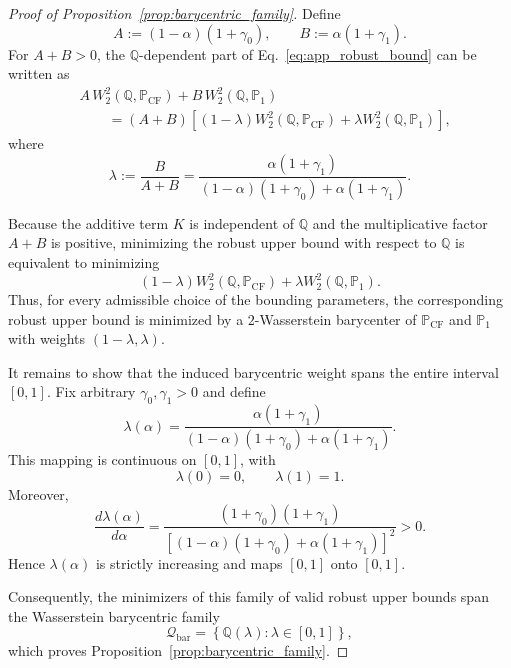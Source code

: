 \begin{proof}[Proof of Proposition~\ref{prop:barycentric_family}]
Define
\begin{equation}
A
:=
(1-\alpha)(1+\gamma_0),
\qquad
B
:=
\alpha(1+\gamma_1).
\label{eq:app_AB}
\end{equation}
For $A+B>0$, the $\mathbb{Q}$-dependent part of
Eq.~\ref{eq:app_robust_bound} can be written as
\begin{align}
&A\,W_2^2(\mathbb{Q},\mathbb{P}_{\mathrm{CF}})
+
B\,W_2^2(\mathbb{Q},\mathbb{P}_1)
\nonumber\\
&\qquad =
(A+B)
\left[
(1-\lambda)
W_2^2(\mathbb{Q},\mathbb{P}_{\mathrm{CF}})
+
\lambda
W_2^2(\mathbb{Q},\mathbb{P}_1)
\right],
\label{eq:app_normalization}
\end{align}
where
\begin{equation}
\lambda
:=
\frac{B}{A+B}
=
\frac{\alpha(1+\gamma_1)}
{(1-\alpha)(1+\gamma_0)+\alpha(1+\gamma_1)}.
\label{eq:app_lambda}
\end{equation}

Because the additive term $K$ is independent of $\mathbb{Q}$ and
the multiplicative factor $A+B$ is positive, minimizing the robust
upper bound with respect to $\mathbb{Q}$ is equivalent to minimizing
\begin{equation}
(1-\lambda)
W_2^2(\mathbb{Q},\mathbb{P}_{\mathrm{CF}})
+
\lambda
W_2^2(\mathbb{Q},\mathbb{P}_1).
\label{eq:app_barycentric_objective}
\end{equation}
Thus, for every admissible choice of the bounding parameters, the
corresponding robust upper bound is minimized by a $2$-Wasserstein
barycenter of $\mathbb{P}_{\mathrm{CF}}$ and $\mathbb{P}_1$ with
weights $(1-\lambda,\lambda)$.

It remains to show that the induced barycentric weight spans the
entire interval $[0,1]$. Fix arbitrary $\gamma_0,\gamma_1>0$ and
define
\begin{equation}
\lambda(\alpha)
=
\frac{\alpha(1+\gamma_1)}
{(1-\alpha)(1+\gamma_0)+\alpha(1+\gamma_1)}.
\end{equation}
This mapping is continuous on $[0,1]$, with
\begin{equation}
\lambda(0)=0,
\qquad
\lambda(1)=1.
\end{equation}
Moreover,
\begin{equation}
\frac{d\lambda(\alpha)}{d\alpha}
=
\frac{(1+\gamma_0)(1+\gamma_1)}
{
\left[
(1-\alpha)(1+\gamma_0)
+
\alpha(1+\gamma_1)
\right]^2
}
>0.
\label{eq:app_lambda_derivative}
\end{equation}
Hence $\lambda(\alpha)$ is strictly increasing and maps $[0,1]$
onto $[0,1]$.

Consequently, the minimizers of this family of valid robust upper
bounds span the Wasserstein barycentric family
\begin{equation}
\mathcal{Q}_{\mathrm{bar}}
=
\left\{
\mathbb{Q}(\lambda):
\lambda\in[0,1]
\right\},
\end{equation}
which proves Proposition~\ref{prop:barycentric_family}.
\end{proof}

